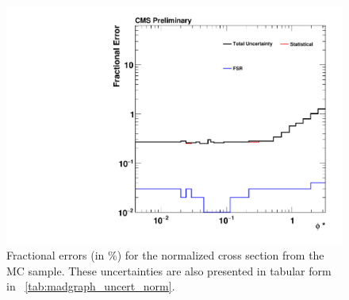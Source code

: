 \begin{figure}[!p]
    \centering
    \includegraphics[width=\textwidth]{figures/madgraph_uncertainty_normalized.pdf}
    \caption[
        Fractional errors (in \%) for the normalized cross section from the
        \MADGRAPH MC sample.
    ]{
        Fractional errors (in \%) for the normalized cross section from the
        \MADGRAPH MC sample. These uncertainties are also presented in tabular
        form in \TAB~\ref{tab:madgraph_uncert_norm}.
    }
    \label{fig:madgraph_uncert_norm}
\end{figure}
